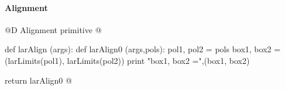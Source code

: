 \documentclass[11pt,oneside]{article}	%
\begin{document}
\paragraph{Alignment}
@D Alignment primitive
@{def larAlign (args):
	def larAlign0 (args,pols):
		pol1, pol2 = pols
		box1, box2 = (larLimits(pol1), larLimits(pol2))
		print "box1, box2 =",(box1, box2)
		
	return larAlign0
@}




\end{document}
